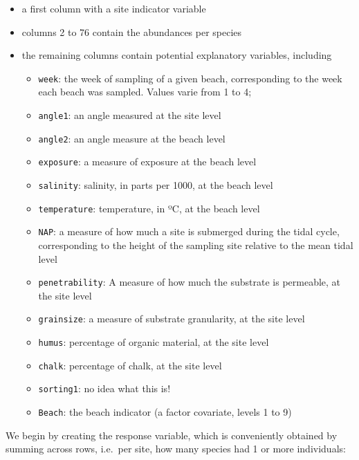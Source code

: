 \documentclass[
]{book}
\newenvironment{Shaded}{\begin{snugshade}}{\end{snugshade}}
\newcommand{\DecValTok}[1]{\textcolor[rgb]{0.00,0.00,0.81}{#1}}
\newcommand{\FunctionTok}[1]{\textcolor[rgb]{0.13,0.29,0.53}{\textbf{#1}}}
\newcommand{\NormalTok}[1]{#1}
\newcommand{\OtherTok}[1]{\textcolor[rgb]{0.56,0.35,0.01}{#1}}
\newcommand{\SpecialCharTok}[1]{\textcolor[rgb]{0.81,0.36,0.00}{\textbf{#1}}}
\providecommand{\tightlist}{%
  \setlength{\itemsep}{0pt}\setlength{\parskip}{0pt}}
\begin{document}
\begin{itemize}
\tightlist
\item
  a first column with a site indicator variable
\item
  columns 2 to 76 contain the abundances per species
\item
  the remaining columns contain potential explanatory variables, including

  \begin{itemize}
  \tightlist
  \item
    \texttt{week}: the week of sampling of a given beach, corresponding to the week each beach was sampled. Values varie from 1 to 4;
  \item
    \texttt{angle1}: an angle measured at the site level
  \item
    \texttt{angle2}: an angle measure at the beach level
  \item
    \texttt{exposure}: a measure of exposure at the beach level\\
  \item
    \texttt{salinity}: salinity, in parts per 1000, at the beach level
  \item
    \texttt{temperature}: temperature, in ºC, at the beach level
  \item
    \texttt{NAP}: a measure of how much a site is submerged during the tidal cycle, corresponding to the height of the sampling site relative to the mean tidal level
  \item
    \texttt{penetrability}: A measure of how much the substrate is permeable, at the site level
  \item
    \texttt{grainsize}: a measure of substrate granularity, at the site level
  \item
    \texttt{humus}: percentage of organic material, at the site level
  \item
    \texttt{chalk}: percentage of chalk, at the site level
  \item
    \texttt{sorting1}: no idea what this is!
  \item
    \texttt{Beach}: the beach indicator (a factor covariate, levels 1 to 9)
  \end{itemize}
\end{itemize}

We begin by creating the response variable, which is conveniently obtained by summing across rows, i.e.~per site, how many species had 1 or more individuals:

\begin{Shaded}
\end{Shaded}
\end{document}
